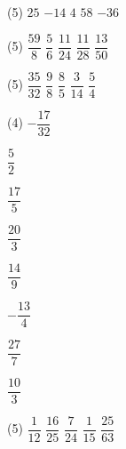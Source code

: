 \documentclass[a4paper,12pt]{report}
\begin{document}
\begin{cora}\phantom{ }

\begin{tasks}(5)
\task ${{25}}$
\task ${{-14}}$
\task ${{4}}$
\task ${{58}}$
\task ${{-36}}$
\end{tasks}

\end{cora}

\begin{cora}\phantom{ }

\begin{tasks}(5)
\task $\dfrac{59}{8}$
\task $\dfrac{5}{6}$ 
\task $\dfrac{11}{24}$
\task $\dfrac{11}{28}$ 
\task $\dfrac{13}{50}$ 
\end{tasks}

\end{cora}

\begin{cora}\phantom{ }

\begin{tasks}(5)
\task $\dfrac{35}{32}$
\task $\dfrac{9}{8}$
\task $\dfrac{8}{5}$
\task $\dfrac{3}{14}$
\task $\dfrac{5}{4}$
\end{tasks}

\end{cora}

\begin{cora}\phantom{ }
\begin{tasks}(4)
\task $-\dfrac{17}{32}$

\task $\dfrac{5}{2}$

\task $\dfrac{17}{5}$

\task $\dfrac{20}{3}$

\task $\dfrac{14}{9}$

\task $-\dfrac{13}{4}$ 

\task $\dfrac{27}{7}$

\task $\dfrac{10}{3}$ 

\end{tasks}


\end{cora}

\begin{cora}\phantom{ }

\begin{tasks}(5)
\task ${{\dfrac{1}{12}}}$
\task  ${{\dfrac{16}{25}}}$
\task ${{\dfrac{7}{24}}}$
\task ${{\dfrac{1}{15}}}$
\task ${{\dfrac{25}{63}}}$
\end{tasks}

\end{cora}
\end{document}
